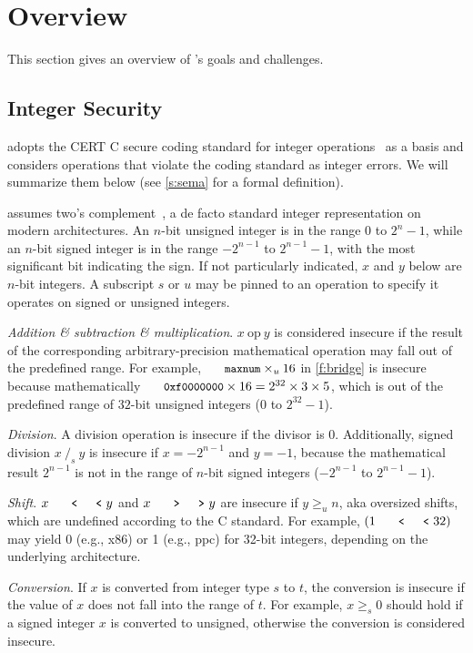\section{Overview}
\label{s:oview}

This section gives an overview of \sys's goals and challenges.

\subsection{Integer Security}

\sys adopts the CERT C secure coding standard for integer
operations~\cite[Ch.~5]{seacord:secure-c} as a basis and considers
operations that violate the coding standard as integer errors.  We
will summarize them below (see \autoref{s:sema} for a formal
definition).

\sys assumes two's complement~\cite[Ch.~4.2.1]{intel:vol1}, a de
facto standard integer representation on modern architectures.  An
$n$-bit unsigned integer is in the range $0$ to $2^n-1$, while an
$n$-bit signed integer is in the range $-2^{n-1}$ to $2^{n-1}-1$,
with the most significant bit indicating the sign.  If not particularly
indicated, $x$ and $y$ below are $n$-bit integers.
A subscript $s$ or $u$ may be pinned to an operation to specify
it operates on signed or unsigned integers.

\noindent
{\it Addition \& subtraction \& multiplication}.
$x\ \textrm{op}\ y$ is considered insecure if the result of the
corresponding arbitrary-precision mathematical operation may fall
out of the predefined range.  For example, $\cc{maxnum}\times_u
16$ in \autoref{f:bridge} is insecure because mathematically
$\cc{0xf0000000} \times 16 = 2^{32}\times 3\times 5$, which is out
of the predefined range of $32$-bit unsigned integers ($0$ to $2^{32}
- 1$).

\noindent
{\it Division}.
A division operation is insecure if the divisor is 0.  Additionally,
signed division $x\ /_s\ y$ is insecure if $x = -2^{n-1}$ and $y =
-1$, because the mathematical result $2^{n-1}$ is not in the range
of $n$-bit signed integers ($-2^{n-1}$ to $2^{n-1}-1$).

\noindent
{\it Shift}. $x \shl y$ and $x \shr y$ are insecure if $y \geq_u
n$, aka oversized shifts, which are undefined according to the C
standard.  For example, $(1 \shl 32)$ may yield 0 (e.g., x86) or 1
(e.g., ppc) for 32-bit integers, depending on the underlying
architecture.

\noindent
{\it Conversion}.
If $x$ is converted from integer type $s$ to $t$, the conversion
is insecure if the value of $x$ does not fall into the range of
$t$.  For example, $x \geq_s 0$ should hold if a signed integer $x$
is converted to unsigned, otherwise the conversion is considered
insecure.

